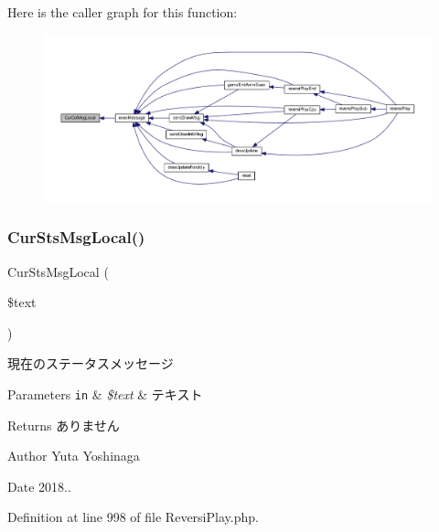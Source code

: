 Here is the caller graph for this function\+:
\nopagebreak
\begin{figure}[H]
\begin{center}
\leavevmode
\includegraphics[width=350pt]{class_reversi_play_aa217a221907e90c97719f8332c60a6d6_icgraph}
\end{center}
\end{figure}
\mbox{\label{class_reversi_play_ae3da8fb1a3a365c6e5254e5cf6f1e7bc}} 
\subsubsection{\texorpdfstring{Cur\+Sts\+Msg\+Local()}{CurStsMsgLocal()}}
{\footnotesize\ttfamily Cur\+Sts\+Msg\+Local (\begin{DoxyParamCaption}\item[{}]{\$text }\end{DoxyParamCaption})\hspace{0.3cm}{\ttfamily [private]}}



現在のステータスメッセージ 


\begin{DoxyParams}[1]{Parameters}
\mbox{\tt in}  & {\em \$text} & テキスト \\
\hline
\end{DoxyParams}
\begin{DoxyReturn}{Returns}
ありません 
\end{DoxyReturn}
\begin{DoxyAuthor}{Author}
Yuta Yoshinaga 
\end{DoxyAuthor}
\begin{DoxyDate}{Date}
2018.. 
\end{DoxyDate}


Definition at line 998 of file Reversi\+Play.\+php.



